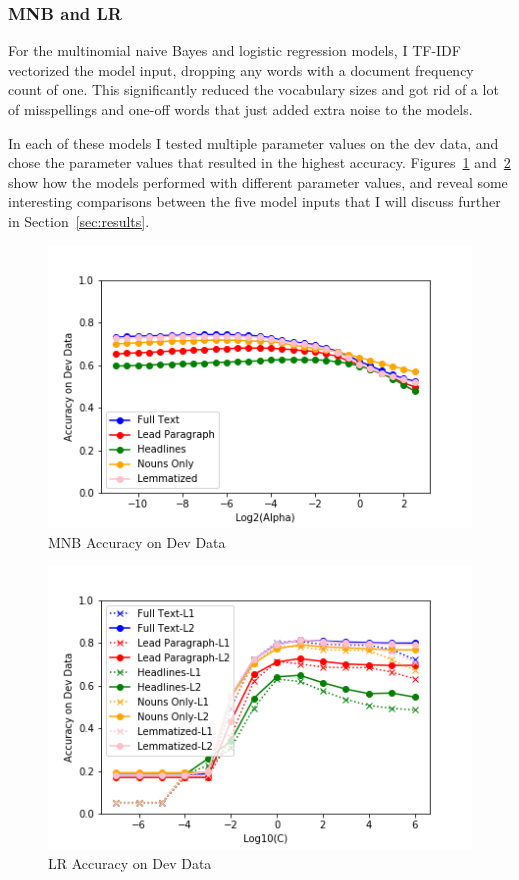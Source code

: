 \documentclass[11pt,a4paper,table]{article}
\begin{document}
\subsubsection{MNB and LR}
\label{sssec:mnb-lr}

For the multinomial naive Bayes and logistic regression models, I TF-IDF vectorized the model input, dropping any words with a document frequency count of one. This significantly reduced the vocabulary sizes and got rid of a lot of misspellings and one-off words that just added extra noise to the models.

In each of these models I tested multiple parameter values on the dev data, and chose the parameter values that resulted in the highest accuracy. Figures~\ref{fig:mnb-acc} and~\ref{fig:lr-acc} show how the models performed with different parameter values, and reveal some interesting comparisons between the five model inputs that I will discuss further in Section~\ref{sec:results}.

\begin{figure}
\centering
\includegraphics[scale=0.55]{mnb_accuracy}
\caption{MNB Accuracy on Dev Data}
\label{fig:mnb-acc}
\end{figure}

\begin{figure}
\centering
\includegraphics[scale=0.55]{lr_accuracy}
\caption{LR Accuracy on Dev Data}
\label{fig:lr-acc}
\end{figure}
\end{document}
